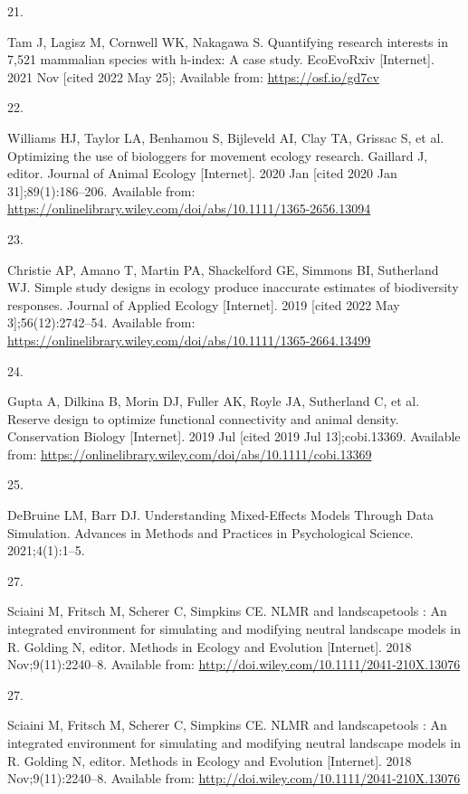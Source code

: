 \documentclass[10pt,a4paper]{article}
\newlength{\cslhangindent}
\newlength{\csllabelwidth}
\newlength{\cslentryspacingunit} %
\newenvironment{CSLReferences}[2] %
 {%
  \setlength{\parindent}{0pt}
  \ifodd #1
  \let\oldpar\par
  \def\par{\hangindent=\cslhangindent\oldpar}
  \fi
  \setlength{\parskip}{#2\cslentryspacingunit}
 }%
 {}
\newcommand{\CSLLeftMargin}[1]{\parbox[t]{\csllabelwidth}{#1}}
\newcommand{\CSLRightInline}[1]{\parbox[t]{\linewidth - \csllabelwidth}{#1}\break}
\begin{document}
\begin{CSLReferences}{0}{0}
\leavevmode\hypertarget{ref-tam_quantifying_2021}{}%
\CSLLeftMargin{21. }
\CSLRightInline{Tam J, Lagisz M, Cornwell WK, Nakagawa S. Quantifying research interests in 7,521 mammalian species with h-index: A case study. EcoEvoRxiv {[}Internet{]}. 2021 Nov {[}cited 2022 May 25{]}; Available from: \url{https://osf.io/gd7cv}}

\leavevmode\hypertarget{ref-williams_optimizing_2020}{}%
\CSLLeftMargin{22. }
\CSLRightInline{Williams HJ, Taylor LA, Benhamou S, Bijleveld AI, Clay TA, Grissac S, et al. Optimizing the use of biologgers for movement ecology research. Gaillard J, editor. Journal of Animal Ecology {[}Internet{]}. 2020 Jan {[}cited 2020 Jan 31{]};89(1):186--206. Available from: \url{https://onlinelibrary.wiley.com/doi/abs/10.1111/1365-2656.13094}}

\leavevmode\hypertarget{ref-christie_simple_2019}{}%
\CSLLeftMargin{23. }
\CSLRightInline{Christie AP, Amano T, Martin PA, Shackelford GE, Simmons BI, Sutherland WJ. Simple study designs in ecology produce inaccurate estimates of biodiversity responses. Journal of Applied Ecology {[}Internet{]}. 2019 {[}cited 2022 May 3{]};56(12):2742--54. Available from: \url{https://onlinelibrary.wiley.com/doi/abs/10.1111/1365-2664.13499}}

\leavevmode\hypertarget{ref-gupta_reserve_2019}{}%
\CSLLeftMargin{24. }
\CSLRightInline{Gupta A, Dilkina B, Morin DJ, Fuller AK, Royle JA, Sutherland C, et al. Reserve design to optimize functional connectivity and animal density. Conservation Biology {[}Internet{]}. 2019 Jul {[}cited 2019 Jul 13{]};cobi.13369. Available from: \url{https://onlinelibrary.wiley.com/doi/abs/10.1111/cobi.13369}}

\leavevmode\hypertarget{ref-debruine_understanding_2021}{}%
\CSLLeftMargin{25. }
\CSLRightInline{DeBruine LM, Barr DJ. Understanding {Mixed}-{Effects} {Models} {Through} {Data} {Simulation}. Advances in Methods and Practices in Psychological Science. 2021;4(1):1--5. }

\leavevmode\hypertarget{ref-Sciaini2018}{}%
\CSLLeftMargin{27. }
\CSLRightInline{Sciaini M, Fritsch M, Scherer C, Simpkins CE. {NLMR} and landscapetools : {An} integrated environment for simulating and modifying neutral landscape models in {R}. Golding N, editor. Methods in Ecology and Evolution {[}Internet{]}. 2018 Nov;9(11):2240--8. Available from: \url{http://doi.wiley.com/10.1111/2041-210X.13076}}

\leavevmode\hypertarget{ref-Sciaini2018}{}%
\CSLLeftMargin{27. }
\CSLRightInline{Sciaini M, Fritsch M, Scherer C, Simpkins CE. {NLMR} and landscapetools : {An} integrated environment for simulating and modifying neutral landscape models in {R}. Golding N, editor. Methods in Ecology and Evolution {[}Internet{]}. 2018 Nov;9(11):2240--8. Available from: \url{http://doi.wiley.com/10.1111/2041-210X.13076}}


\end{CSLReferences}
\end{document}
